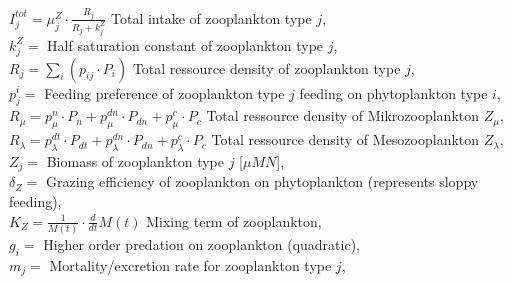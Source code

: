 \documentclass[11pt,letterpaper,english]{article}
\begin{document}
\mbox{} \hspace{.5cm} $I^{tot}_j= \mu^{Z}_j⋅\frac{R_{j}}{R_{j} + k^Z_j}$ Total intake of zooplankton type $j$,\\
\mbox{} \hspace{.5cm} $k^Z_j =$ Half saturation constant of zooplankton type $j$,\\
\mbox{} \hspace{.5cm} $R_{j}= \sum_{i} (p_{i j}⋅P_{i})$ Total ressource density of zooplankton type $j$,\\
\mbox{} \hspace{.5cm} $p^i_{j}=$ Feeding preference of zooplankton type $j$ feeding on phytoplankton type $i$,\\
\mbox{} \hspace{.5cm} $R_{\mu}= p^n_{\mu}⋅P_{n} + p^{dn}_{\mu}⋅P_{dn} + p^c_{\mu}⋅P_{c}$ Total ressource density of Mikrozooplankton $Z_{\mu}$,\\
\mbox{} \hspace{.5cm} $R_{\lambda}= p^{dt}_{\lambda}⋅P_{dt} + p^{dn}_{\lambda}⋅P_{dn} + p^c_{\lambda}⋅P_{c}$ Total ressource density of Mesozooplankton $Z_{\lambda}$,\\



\mbox{} \hspace{.5cm} $Z_j=$ Biomass of zooplankton type $j$ [$\mu M N$],\\
\mbox{} \hspace{.5cm} $\delta_{Z}=$ Grazing efficiency of zooplankton on phytoplankton (represents sloppy feeding), \\
\mbox{} \hspace{.5cm} $K_{Z}=\frac{1}{M(t)} \cdot \frac{d}{d t} M(t)$ Mixing term of zooplankton, \\
\mbox{} \hspace{.5cm} $g_{i}=$ Higher order predation on zooplankton (quadratic), \\
\mbox{} \hspace{.5cm} $m_{j}=$ Mortality/excretion rate for zooplankton type $j$,\\



\vspace{.2cm}
%
%
%
%
\end{document}
